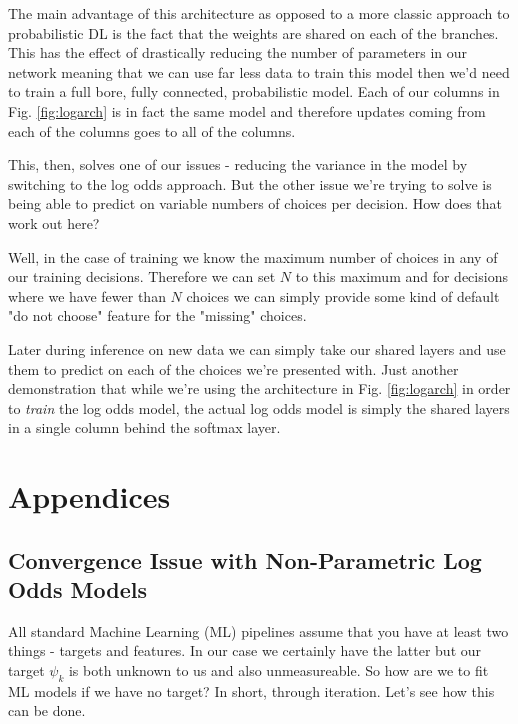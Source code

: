 \documentclass[11pt]{article}
\begin{document}
The main advantage of this architecture as opposed to a more classic approach to probabilistic DL is the fact that the weights are shared on each of the branches. This has the effect of drastically reducing the number of parameters in our network meaning that we can use far less data to train this model then we'd need to train a full bore, fully connected, probabilistic model. Each of our columns in Fig. \ref{fig:logarch} is in fact the same model and therefore updates coming from each of the columns goes to all of the columns.

This, then, solves one of our issues - reducing the variance in the model by switching to the log odds approach. But the other issue we're trying to solve is being able to predict on variable numbers of choices per decision. How does that work out here?\newline

Well, in the case of training we know the maximum number of choices in any of our training decisions. Therefore we can set $N$ to this maximum and for decisions where we have fewer than $N$ choices we can simply provide some kind of default "do not choose" feature for the "missing" choices. 

Later during inference on new data we can simply take our shared layers and use them to predict on each of the choices we're presented with. Just another demonstration that while we're using the architecture in Fig. \ref{fig:logarch} in order to \textit{train} the log odds model, the actual log odds model is simply the shared layers in a single column behind the softmax layer. 


\newpage
\section{Appendices}

\subsection{Convergence Issue with Non-Parametric Log Odds Models} \label{convergence issues}

All standard Machine Learning (ML) pipelines assume that you have at least two things - targets and features. In our case we certainly have the latter but our target $\psi_k$ is both unknown to us and also unmeasureable. So how are we to fit ML models if we have no target? In short, through iteration. Let's see how this can be done.\newline
\end{document}
